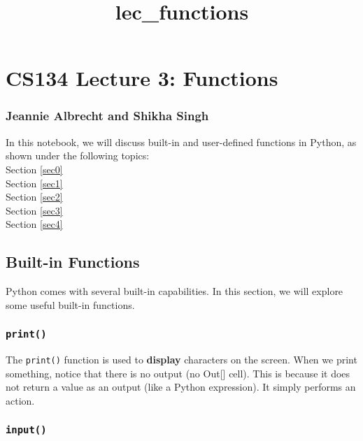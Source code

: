 \documentclass[11pt]{article}
\title{lec\_functions}
\begin{document}
    
    \maketitle
    
    

    
    \hypertarget{cs134-lecture-3-functions}{%
\section{CS134 Lecture 3: Functions}\label{cs134-lecture-3-functions}}

\hypertarget{jeannie-albrecht-and-shikha-singh}{%
\subsubsection{Jeannie Albrecht and Shikha
Singh}\label{jeannie-albrecht-and-shikha-singh}}

In this notebook, we will discuss built-in and user-defined functions in
Python, as shown under the following topics:\\
Section \ref{sec0}\\
Section \ref{sec1}\\
Section \ref{sec2}\\
Section \ref{sec3}\\
Section \ref{sec4}

    

    \hypertarget{built-in-functions}{%
\subsection{Built-in Functions}\label{built-in-functions}}

Python comes with several built-in capabilities. In this section, we
will explore some useful built-in functions.

\hypertarget{print}{%
\subsubsection{\texorpdfstring{\texttt{print()}}{print()}}\label{print}}

The \texttt{print()} function is used to \textbf{display} characters on
the screen. When we print something, notice that there is no output (no
Out{[}{]} cell). This is because it does not return a value as an output
(like a Python expression). It simply performs an action.

\hypertarget{input}{%
\subsubsection{\texorpdfstring{\texttt{input()}}{input()}}\label{input}}
\end{document}
